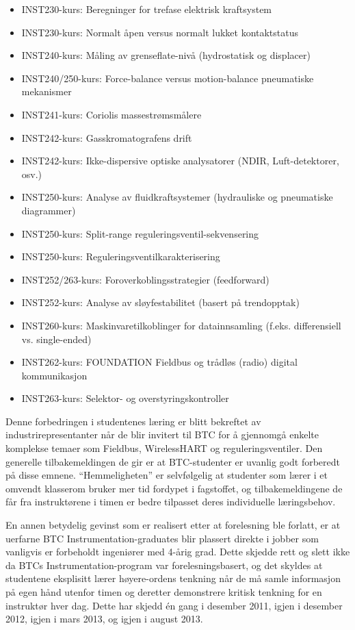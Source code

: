 \begin{itemize}
\item{} INST230-kurs: Beregninger for trefase elektrisk kraftsystem
\item{} INST230-kurs: Normalt åpen versus normalt lukket kontaktstatus
\item{} INST240-kurs: Måling av grenseflate-nivå (hydrostatisk og displacer)
\item{} INST240/250-kurs: Force-balance versus motion-balance pneumatiske mekanismer
\item{} INST241-kurs: Coriolis massestrømsmålere
\item{} INST242-kurs: Gasskromatografens drift
\item{} INST242-kurs: Ikke-dispersive optiske analysatorer (NDIR, Luft-detektorer, osv.)
\item{} INST250-kurs: Analyse av fluidkraftsystemer (hydrauliske og pneumatiske diagrammer)
\item{} INST250-kurs: Split-range reguleringsventil-sekvensering
\item{} INST250-kurs: Reguleringsventilkarakterisering
\item{} INST252/263-kurs: Foroverkoblingsstrategier (feedforward)
\item{} INST252-kurs: Analyse av sløyfestabilitet (basert på trendopptak)
\item{} INST260-kurs: Maskinvaretilkoblinger for datainnsamling (f.eks. differensiell vs. single-ended)
\item{} INST262-kurs: FOUNDATION Fieldbus og trådløs (radio) digital kommunikasjon
\item{} INST263-kurs: Selektor- og overstyringskontroller
\end{itemize}

Denne forbedringen i studentenes læring er blitt bekreftet av industrirepresentanter når de blir invitert til BTC for å gjennomgå enkelte komplekse temaer som Fieldbus, WirelessHART og reguleringsventiler.  Den generelle tilbakemeldingen de gir er at BTC-studenter er uvanlig godt forberedt på disse emnene.  ``Hemmeligheten'' er selvfølgelig at studenter som lærer i et omvendt klasserom bruker mer tid fordypet i fagstoffet, og tilbakemeldingene de får fra instruktørene i timen er bedre tilpasset deres individuelle læringsbehov.

\vskip 10pt

En annen betydelig gevinst som er realisert etter at forelesning ble forlatt, er at uerfarne BTC Instrumentation-graduates blir plassert direkte i jobber som vanligvis er forbeholdt ingeniører med 4-årig grad.  Dette skjedde rett og slett ikke da BTCs Instrumentation-program var forelesningsbasert, og det skyldes at studentene eksplisitt lærer høyere-ordens tenkning når de må samle informasjon på egen hånd utenfor timen og deretter demonstrere kritisk tenkning for en instruktør hver dag.  Dette har skjedd én gang i desember 2011, igjen i desember 2012, igjen i mars 2013, og igjen i august 2013.

